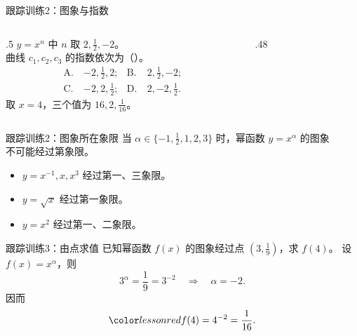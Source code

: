\documentclass[aspectratio=169,10pt]{beamer}
\begin{document}


\begin{frame}[t]{跟踪训练2：图象与指数}
 \begin{columns}[T,onlytextwidth]
  \begin{column}{.5\textwidth}
   $y=x^n$ 中 $n$ 取 $2,\frac12,-2$。\\
   曲线 $c_1,c_2,c_3$ 的指数依次为（\quad）。
   \normalsize
   \begin{align*}
    \mathrm A.&\ {-2},\tfrac12,2;&\mathrm B.&\ 2,\tfrac12,-2;\\
    \mathrm C.&\ {-2},2,\tfrac12;&\mathrm D.&\ 2,-2,\tfrac12.
   \end{align*}
   \pause
   取 $x=4$，三个值为 $16,2,\frac1{16}$。\\
  \end{column}
  \begin{column}{.48\textwidth}
  \end{column}
 \end{columns}
\end{frame}

\begin{frame}[t]{跟踪训练2：图象所在象限}
 当 $\alpha\in\{-1,\frac12,1,2,3\}$ 时，幂函数 $y=x^\alpha$ 的图象\\
 不可能经过第\underline{\hspace{1cm}}象限。
 \pause
 \begin{itemize}
  \item $y=x^{-1},x,x^3$ 经过第一、三象限。
  \item $y=\sqrt x$ 经过第一象限。
  \item $y=x^2$ 经过第一、二象限。
 \end{itemize}
\end{frame}

\begin{frame}[t]{跟踪训练3：由点求值}
 已知幂函数 $f(x)$ 的图象经过点 $\left(3,\frac19\right)$，求 $f(4)$。
 \pause
 设 $f(x)=x^\alpha$，则
 \[3^\alpha=\frac19=3^{-2}\quad\Longrightarrow\quad\alpha=-2.\]
 因而
 \[\ans{f(4)=4^{-2}=\frac1{16}}.\]
\end{frame}
\end{document}
